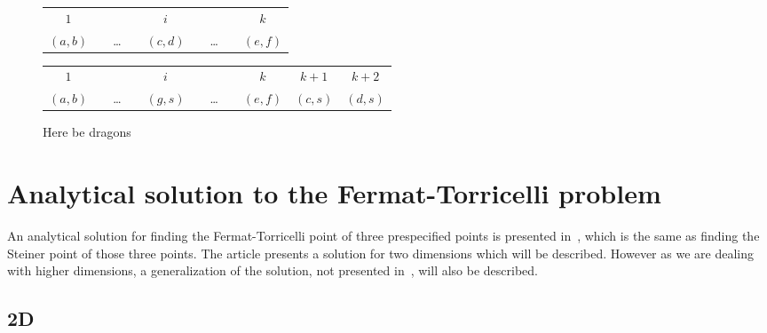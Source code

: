 \begin{figure}[htbp]
  \centering
  \begin{tabular}{|c|ccc|c|ccc|c|}
    \multicolumn{1}{c}{$1$} &
    \multicolumn{3}{c}{ } &
    \multicolumn{1}{c}{$i$} &
    \multicolumn{3}{c}{ } &
    \multicolumn{1}{c}{$k$} \\
    \cline{1-2} \cline{4-6} \cline{8-9}
    $(a,b)$ & & \ldots & & $(c,d)$ & & \ldots & & $(e,f)$ \\
    \cline{1-2} \cline{4-6} \cline{8-9}
  \end{tabular}

  \begin{tabular}{|c|ccc|c|ccc|c|c|c|}
    \multicolumn{1}{c}{$1$} &
    \multicolumn{3}{c}{ } &
    \multicolumn{1}{c}{$i$} &
    \multicolumn{3}{c}{ } &
    \multicolumn{1}{c}{$k$} &
    \multicolumn{1}{c}{$k+1$} &
    \multicolumn{1}{c}{$k+2$} \\
    \cline{1-2} \cline{4-6} \cline{8-11}
    $(a,b)$ & & \ldots & & $(g,s)$ & & \ldots & & $(e,f)$ & $(c,s)$ & $(d,s)$ \\
    \cline{1-2} \cline{4-6} \cline{8-11}
  \end{tabular}
  \caption{Here be dragons}
\end{figure}


\section{Analytical solution to the Fermat-Torricelli problem}
\label{sec:analyt-solut-ferm}

An analytical solution for finding the Fermat-Torricelli point of three
prespecified points is presented in~\cite{Uteshev2012}, which is the same as
finding the Steiner point of those three points.  The article presents a
solution for two dimensions which will be described.  However as we are dealing
with  higher dimensions, a generalization of the solution, not presented
in~\cite{Uteshev2012}, will also be described.


\subsection{2D}
\label{sec:2d}

